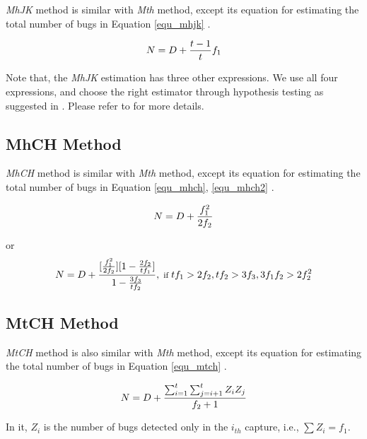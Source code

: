 \documentclass[sigconf,review, anonymous]{acmart}
\begin{document}
\textit{MhJK} method is similar with \textit{Mth} method, except its equation for estimating the total number of bugs in Equation \ref{equ_mhjk} \cite{MhJKburnham1978estimation}.

\begin{equation}\label{equ_mhjk}
\footnotesize{ N = D + \frac{t-1}{t}f_1 }
\end{equation}

Note that, the \textit{MhJK} estimation has three other expressions. 
We use all four expressions, and choose the right estimator through hypothesis testing as suggested in \cite{MhJKburnham1978estimation}.
Please refer to \cite{MhJKburnham1978estimation} for more details.


\subsection{MhCH Method}
\label{subsec:method_MhCH}

\textit{MhCH} method is similar with \textit{Mth} method, except its equation for estimating the total number of bugs in Equation \ref{equ_mhch}, \ref{equ_mhch2} \cite{MhCHchao1988estimating}.

\begin{equation}\label{equ_mhch}
\footnotesize{ N = D + \frac{f_1^2}{2f_2} }
\end{equation}

or
\begin{equation}\label{equ_mhch2}
\footnotesize{ N = D + \frac{[\frac{f_1^2}{2f_2}][1-\frac{2f_2}{tf_1}]}{1 - \frac{3f_3}{tf_2}}, \mbox{ if } tf_1 > 2f_2, tf_2 > 3f_3, 3f_1f_2 > 2f_2^2 }
\end{equation}


\subsection{MtCH Method}
\label{subsec:method_MtCH}

\textit{MtCH} method is also similar with \textit{Mth} method, except its equation for estimating the total number of bugs in Equation \ref{equ_mtch} \cite{MtCHchao1987estimating}.

\begin{equation}\label{equ_mtch}
\footnotesize{ N = D + \frac{\sum_{i=1}^{t} \sum_{j=i+1}^{t}Z_iZ_j}{f_2+1} }
\end{equation}

In it, $Z_i$ is the number of bugs detected only in the $i_{th}$ capture, i.e., $\sum Z_i = f_1$.
\end{document}
